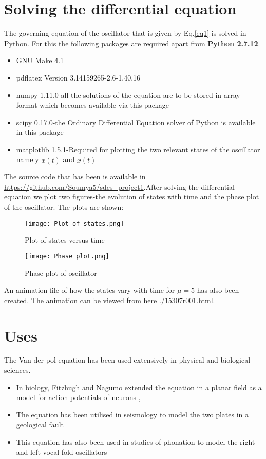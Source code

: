 \documentclass[a4paper]{article}
\begin{document}
\section{Solving the differential equation}
The governing equation of the oscillator that is given by Eq.\ref{eq1} is solved in Python. For this the following packages are required 
apart from \textbf{Python 2.7.12}.
\begin{itemize}
    \item{GNU Make 4.1}
    \item{pdflatex Version 3.14159265-2.6-1.40.16} 
    \item{numpy 1.11.0}-all the solutions of the equation are to be stored in array format which becomes available via this package
    \item{scipy 0.17.0}-the Ordinary Differential Equation solver of Python is available in this package
    \item{matplotlib 1.5.1}-Required for plotting the two relevant states of the oscillator namely $x(t)$ and $\dot{x(t)}$
\end{itemize}
The source code that has been is available in \url{https://github.com/Soumya5/sdes_project1}.After solving the differential equation we plot two figures-the evolution of states with time and the phase plot of the oscillator. The plots are shown:-
\begin{figure}[H]
    \centering
    \texttt{[image: Plot\_of\_states.png]}
    \caption{Plot of states versus time}
\end{figure}
\begin{figure}[H]
    \centering
    \texttt{[image: Phase\_plot.png]}
    \caption{Phase plot of oscillator}
\end{figure}
An animation file of how the states vary with time for $\mu=5$ has also been created. The animation can be viewed from here \url{./15307r001.html}.
\section{Uses}
The Van der pol equation has been used extensively in physical and biological sciences.
\begin{itemize}
    \item In biology, Fitzhugh and Nagumo extended the equation in a planar field as a model for action potentials of neurons \cite{fitz}, \cite{nagumo1962}
    \item The equation has been utilised in seismology to model the two plates in a geological fault \cite{seis}
    \item This equation has also been used in studies of phonation to model the right and left vocal fold oscillators \cite{phonation}
\end{itemize}
{}

\end{document}

